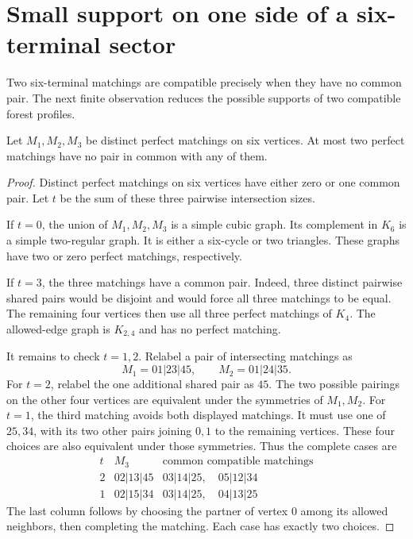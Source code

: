 \section{Small support on one side of a six-terminal sector}
\label{sec:path-six-matching-support}

Two six-terminal matchings are compatible precisely when they have no common pair.
The next finite observation reduces the possible supports of two compatible forest profiles.

\begin{lemma}
\label{lem:path-six-three-common-partners}
Let $M_1,M_2,M_3$ be distinct perfect matchings on six vertices.
At most two perfect matchings have no pair in common with any of them.
\end{lemma}

\begin{proof}
Distinct perfect matchings on six vertices have either zero or one common pair.
Let $t$ be the sum of these three pairwise intersection sizes.

If $t=0$, the union of $M_1,M_2,M_3$ is a simple cubic graph.
Its complement in $K_6$ is a simple two-regular graph.
It is either a six-cycle or two triangles.
These graphs have two or zero perfect matchings, respectively.

If $t=3$, the three matchings have a common pair.
Indeed, three distinct pairwise shared pairs would be disjoint and would force all three matchings to be equal.
The remaining four vertices then use all three perfect matchings of $K_4$.
The allowed-edge graph is $K_{2,4}$ and has no perfect matching.

It remains to check $t=1,2$.
Relabel a pair of intersecting matchings as
\[
 M_1=01|23|45,\qquad M_2=01|24|35.
\]
For $t=2$, relabel the one additional shared pair as $45$.
The two possible pairings on the other four vertices are equivalent under the symmetries of $M_1,M_2$.
For $t=1$, the third matching avoids both displayed matchings.
It must use one of $25,34$, with its two other pairs joining $0,1$ to the remaining vertices.
These four choices are also equivalent under those symmetries.
Thus the complete cases are
\[
\begin{array}{c|c|c}
 t&M_3&\text{common compatible matchings}\\\hline
 2&02|13|45&03|14|25,\quad05|12|34\\
 1&02|15|34&03|14|25,\quad04|13|25
\end{array}
\]
The last column follows by choosing the partner of vertex $0$ among its allowed neighbors, then completing the matching.
Each case has exactly two choices.
\end{proof}

